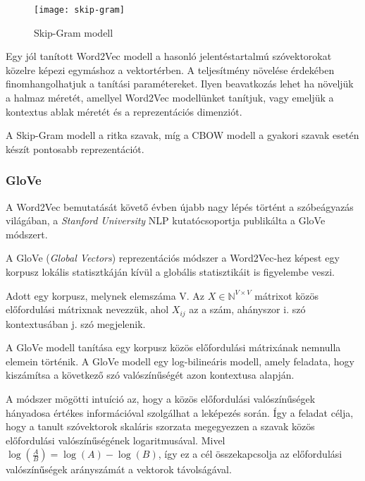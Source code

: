 \begin{figure}[H]
	\centering
	\texttt{[image: skip-gram]}
	\caption{Skip-Gram modell}
\end{figure}

Egy jól tanított Word2Vec modell a hasonló jelentéstartalmú szóvektorokat közelre képezi egymáshoz a vektortérben. 
A teljesítmény növelése érdekében finomhangolhatjuk a tanítási paramétereket. Ilyen beavatkozás lehet ha növeljük a halmaz méretét, amellyel Word2Vec modellünket tanítjuk, vagy emeljük a kontextus ablak méretét és a reprezentációs dimenziót.

\begin{note}
	A Skip-Gram modell a ritka szavak, míg a CBOW modell a gyakori szavak esetén készít pontosabb reprezentációt.
\end{note}


\subsubsection{GloVe}
A Word2Vec bemutatását követő évben újabb nagy lépés történt a szóbeágyazás világában, a \textit{Stanford University} NLP kutatócsoportja publikálta a GloVe módszert.

A GloVe (\textit{Global Vectors}) \cite{pennington2014glove} reprezentációs módszer a Word2Vec-hez képest egy korpusz lokális statisztkáján kívül a globális statisztikáit is figyelembe veszi. 

\begin{definition}
	Adott egy korpusz, melynek elemszáma V. Az $X \in \mathbb{N}^{V \times V}$ mátrixot közös előfordulási mátrixnak nevezzük, ahol $X_{ij}$ az a szám, ahányszor i. szó kontextusában j. szó megjelenik.  
\end{definition}

A GloVe modell tanítása egy korpusz közös előfordulási mátrixának nemnulla elemein történik. A GloVe modell egy log-bilineáris modell, amely feladata, hogy kiszámítsa a következő szó valószínűségét azon kontextusa alapján.

A módszer mögötti intuíció az, hogy a közös előfordulási valószínűségek hányadosa értékes információval szolgálhat a leképezés során. Így a feladat célja, hogy a tanult szóvektorok skaláris szorzata megegyezzen a szavak közös előfordulási valószínűségének logaritmusával. Mivel $\log \left( \frac{A}{B} \right) = \log \left( A \right) - \log \left( B \right)$, így ez a cél összekapcsolja az előfordulási valószínűségek arányszámát a vektorok távolságával.

